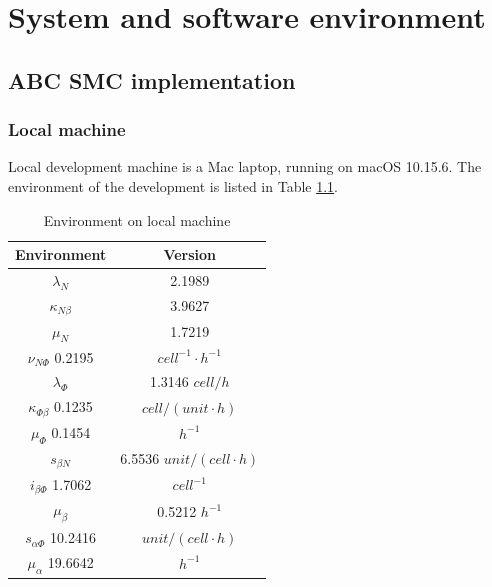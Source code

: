 \appendix

\chapter{System and software environment}

\section{ABC SMC implementation}

\subsection{Local machine}

Local development machine is a Mac laptop, running on macOS 10.15.6. The environment of the development is listed in Table \ref{table:local_macine}.

\begin{table}[H]
    \centering
    \begin{tabular}{|c c|}
        \hline
        Environment                 & Version                       \\ [0.5ex]
        \hline\hline
        $\lambda_N$                 & 2.1989                        \\
        $\kappa_{N\beta}$           & 3.9627                        \\
        $\mu_N$                     & 1.7219                        \\
        $\nu_{N\Phi}$  0.2195       & $cell^{-1}\cdotp h^{-1}$      \\
        \hline
        $\lambda_\Phi$              & 1.3146  $cell/h$              \\
        $\kappa_{\Phi\beta}$ 0.1235 & $cell/(unit\cdotp h)$         \\
        $\mu_\Phi$  0.1454          & $h^{-1}$                      \\
        \hline
        $s_{\beta N}$               & 6.5536  $unit/(cell\cdotp h)$ \\
        $i_{\beta\Phi}$  1.7062     & $cell^{-1}$                   \\
        $\mu_\beta$                 & 0.5212  $h^{-1}$              \\
        \hline
        $s_{\alpha\Phi}$  10.2416   & $unit/(cell\cdotp h)$         \\
        $\mu_\alpha$ 19.6642        & $h^{-1}$                      \\
        [1ex]
        \hline
    \end{tabular}
    \caption{Environment on local machine}
    \label{table:local_macine}
\end{table}

